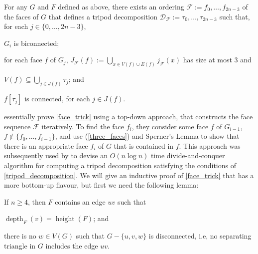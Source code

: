 \documentclass{patmorin}
\DeclareMathOperator{\height}{height}
\DeclareMathOperator{\depth}{depth}
\begin{document}
\begin{lem}\label{face_trick}
  For any $G$ and $F$ defined as above, there exists an ordering $\mathcal{F}:=f_0,\ldots,f_{2n-3}$ of the faces of $G$ that defines a tripod decomposition $\mathcal{D}_\mathcal{F}:=\tau_0,\ldots,\tau_{2n-3}$ such that, for each $j\in\{0,\ldots,2n-3\}$,
  \begin{compactenum}[(i)]
    \item \label{biconnected} $G_i$ is biconnected;
    \item \label{three_faces} for each face $f$ of $G_j$, $J_\mathcal{F}(f):=\bigcup_{x\in V(f)\cup E(f)} j_\mathcal{F}(x)$ has size at most $3$ and
    \begin{compactenum}[(a)]
      \item $V(f)\subseteq \bigcup_{j\in J(f)} \tau_{j}$; and
      \item $f[\tau_{j}]$ is connected, for each $j\in J(f)$.
    \end{compactenum}
  \end{compactenum}
\end{lem}

\citet{dujmovic.joret.ea:planar} essentially prove \cref{face_trick} using a top-down approach, that constructs the face sequence $\mathcal{F}$ iteratively.  To find the face $f_i$, they consider some face $f$ of $G_{i-1}$, $f\not\in\{f_0,\ldots,f_{i-1}\}$, and use (\ref{three_faces}) and Sperner's Lemma to show that there is an appropriate face $f_i$ of $G$ that is contained in $f$.  This approach was subsequently used by \citet{morin:fast} to devise an $O(n\log n)$ time divide-and-conquer algorithm for computing a tripod decomposition satisfying the conditions of \cref{tripod_decomposition}.  We will give an inductive proof of \cref{face_trick} that has a more bottom-up flavour, but first we need the following lemma:


\begin{lem}\label{good_deep_edge}
  If $n\ge 4$, then $F$ contains an edge $uv$ such that
  \begin{compactenum}[(i)]
    \item\label{max_depth} $\depth_{F}(v)=\height(F)$; and
    \item\label{no_separating_triangle} there is no $w\in V(G)$ such that $G-\{u,v,w\}$ is disconnected, i.e, no separating triangle in $G$ includes the edge $uv$.
  \end{compactenum}
\end{lem}
\end{document}
